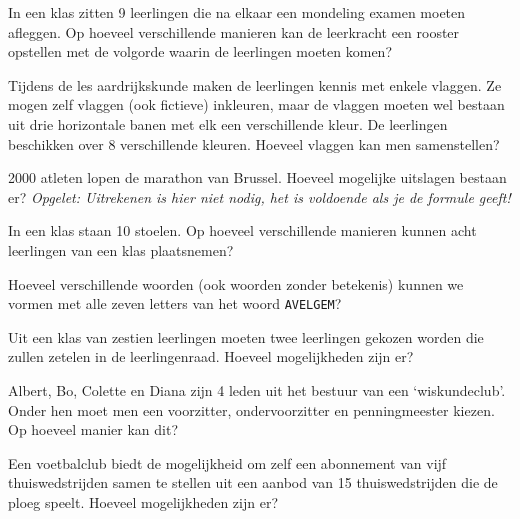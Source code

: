 \documentclass[12pt,twoside]{article}
\begin{document}
\begin{oefening}
In een klas zitten 9 leerlingen die na elkaar een mondeling examen moeten afleggen.
Op hoeveel verschillende manieren kan de leerkracht een rooster opstellen met de
volgorde waarin de leerlingen moeten komen?
\end{oefening}

\begin{oefening}
Tijdens de les aardrijkskunde maken de leerlingen kennis met enkele vlaggen. Ze mogen zelf
vlaggen (ook fictieve) inkleuren, maar de vlaggen moeten wel bestaan uit drie horizontale banen met
elk een verschillende kleur. De leerlingen beschikken over 8 verschillende kleuren. Hoeveel vlaggen
kan men samenstellen?
\end{oefening}

\begin{oefening}
2000 atleten lopen de marathon van Brussel. Hoeveel mogelijke uitslagen bestaan er?
{\em Opgelet: Uitrekenen is hier niet nodig, het is voldoende als je de formule geeft!}
\end{oefening}

\begin{oefening}
In een klas staan 10 stoelen. Op hoeveel verschillende manieren kunnen acht leerlingen van een
klas plaatsnemen?
\end{oefening}

\begin{oefening}
Hoeveel verschillende woorden (ook woorden zonder betekenis) kunnen we vormen met alle zeven
letters van het woord \verb#AVELGEM#?
\end{oefening}

\begin{oefening}
Uit een klas van zestien leerlingen moeten twee leerlingen gekozen worden die zullen zetelen in de
leerlingenraad. Hoeveel mogelijkheden zijn er?
\end{oefening}

\begin{oefening}
Albert, Bo, Colette en Diana zijn 4 leden uit het bestuur van een ‘wiskundeclub’. Onder hen moet
men een voorzitter, ondervoorzitter en penningmeester kiezen. Op hoeveel manier kan dit?
\end{oefening}

\begin{oefening}
Een voetbalclub biedt de mogelijkheid om zelf een abonnement van vijf
thuiswedstrijden samen te stellen uit een aanbod van 15 thuiswedstrijden die de
ploeg speelt. Hoeveel mogelijkheden zijn er?
\end{oefening}
\end{document}
